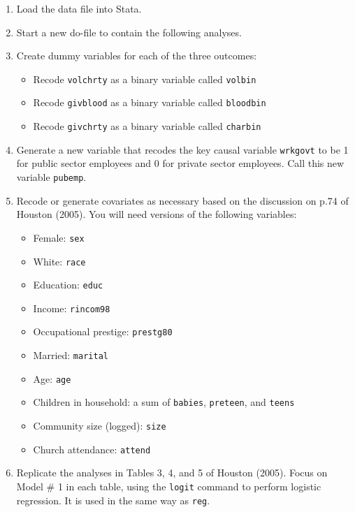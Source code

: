 \documentclass[a4paper,12pt]{article}
\begin{document}
\begin{enumerate}\itemsep1em

\item Load the data file into Stata.

\item Start a new do-file to contain the following analyses.

\item Create dummy variables for each of the three outcomes:

	\begin{itemize}
	\item Recode \texttt{volchrty} as a binary variable called \texttt{volbin} 
	\item Recode \texttt{givblood} as a binary variable called \texttt{bloodbin}
	\item Recode \texttt{givchrty} as a binary variable called \texttt{charbin}
	\end{itemize}

\item Generate a new variable that recodes the key causal variable \texttt{wrkgovt} to be 1 for public sector employees and 0 for private sector employees. Call this new variable \texttt{pubemp}.

\item Recode or generate covariates as necessary based on the discussion on p.74 of Houston (2005). You will need versions of the following variables:

	\begin{itemize}
	\item Female: \texttt{sex}
	\item White: \texttt{race}
	\item Education: \texttt{educ}
	\item Income: \texttt{rincom98}
	\item Occupational prestige: \texttt{prestg80}
	\item Married: \texttt{marital}
	\item Age: \texttt{age}
	\item Children in household: a sum of \texttt{babies}, \texttt{preteen}, and \texttt{teens}
	\item Community size (logged): \texttt{size}
	\item Church attendance: \texttt{attend}
	\end{itemize}

\item Replicate the analyses in Tables 3, 4, and 5 of Houston (2005). Focus on Model \# 1 in each table, using the \texttt{logit} command to perform logistic regression. It is used in the same way as \texttt{reg}.


\end{enumerate}
\end{document}
